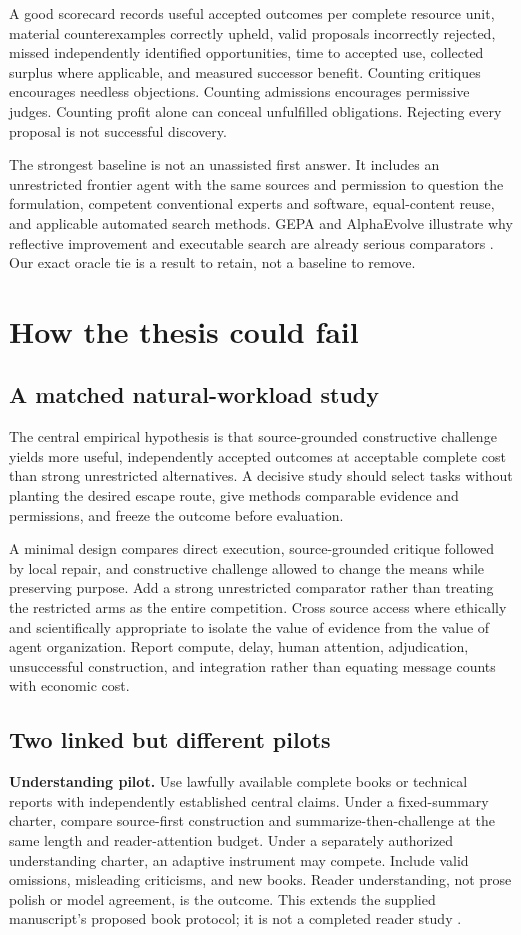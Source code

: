 \documentclass[11pt,a4paper]{article}
\begin{document}
A good scorecard records useful accepted outcomes per complete resource unit, material counterexamples correctly upheld, valid proposals incorrectly rejected, missed independently identified opportunities, time to accepted use, collected surplus where applicable, and measured successor benefit. Counting critiques encourages needless objections. Counting admissions encourages permissive judges. Counting profit alone can conceal unfulfilled obligations. Rejecting every proposal is not successful discovery.

The strongest baseline is not an unassisted first answer. It includes an unrestricted frontier agent with the same sources and permission to question the formulation, competent conventional experts and software, equal-content reuse, and applicable automated search methods. GEPA and AlphaEvolve illustrate why reflective improvement and executable search are already serious comparators \cite{gepa,alphaevolve}. Our exact oracle tie is a result to retain, not a baseline to remove.

\section{How the thesis could fail}
\subsection{A matched natural-workload study}
The central empirical hypothesis is that source-grounded constructive challenge yields more useful, independently accepted outcomes at acceptable complete cost than strong unrestricted alternatives. A decisive study should select tasks without planting the desired escape route, give methods comparable evidence and permissions, and freeze the outcome before evaluation.

A minimal design compares direct execution, source-grounded critique followed by local repair, and constructive challenge allowed to change the means while preserving purpose. Add a strong unrestricted comparator rather than treating the restricted arms as the entire competition. Cross source access where ethically and scientifically appropriate to isolate the value of evidence from the value of agent organization. Report compute, delay, human attention, adjudication, unsuccessful construction, and integration rather than equating message counts with economic cost.

\subsection{Two linked but different pilots}
\textbf{Understanding pilot.} Use lawfully available complete books or technical reports with independently established central claims. Under a fixed-summary charter, compare source-first construction and summarize-then-challenge at the same length and reader-attention budget. Under a separately authorized understanding charter, an adaptive instrument may compete. Include valid omissions, misleading criticisms, and new books. Reader understanding, not prose polish or model agreement, is the outcome. This extends the supplied manuscript's proposed book protocol; it is not a completed reader study \cite[App.~C]{ti}.
\end{document}
